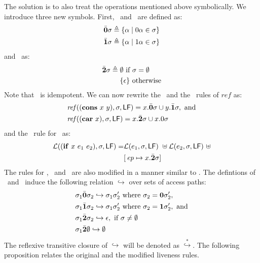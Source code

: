 \documentclass[9pt]{sigplanconf}
\begin{document}
The  solution  is  to   also  treat  the  operations  mentioned  above
symbolically.  We  introduce three  new  symbols.   First, \bcar\  and
\bcdr\ are defined as:
\begin{align*}
 \bar{\mathbf{0}}\sigma &\triangleq \{\alpha \mid 0\alpha \in \sigma\}\\
 \bar{\mathbf{1}}\sigma &\triangleq \{\alpha \mid 1\alpha \in \sigma\}
\end{align*}
and \cbar\ as:
\begin{align*}
 \bar{\mathbf{2}}\sigma \triangleq\; & \emptyset~\mbox{if}~\sigma = \emptyset\\
                       & \{\epsilon\} ~\mbox{otherwise}
\end{align*}
Note that \cbar\ is idempotent. 
We can now rewrite the \CONS\ and the \CAR\ rules of $\mathit{ref}$ as:
\begin{align*}
&\mathit{ref\/}((\mbox{$\mathbf{cons}$}~x~y),\sigma,\mathsf{LF})
= x.\bar{\mathbf{0}}\sigma \cup y.\bar{\mathbf{1}}\sigma  \label{eqn:mod-cons},~
\mbox{and} \\
&\mathit{ref\/}((\mbox{$\mathbf{car}$}~x),\sigma,\mathsf{LF})
          =   x.\bar{\mathbf{2}}\sigma \cup x.0\sigma
\end{align*}
and the \Lfunonly\ rule
for \SIF\ as:
\begin{align*}
\mathcal{L}((\mbox{$\mathbf{ if}$}~x~e_1~e_2),\sigma,\mathsf{LF}) =
                    &\mathcal{L}(e_1,\sigma,\mathsf{LF})~\uplus
        \mathcal{L}(e_2,\sigma,\mathsf{LF})~\uplus\\
        &[\,\mathit{ep} \mapsto  x.\bar{\mathbf{2}} \sigma]
\end{align*}
The rules for \CDR, \PRIM\ and  \NULLQ\  are also modified in a manner
similar to \CAR.
The  defintions of \bcar\, \bcdr\ and \cbar\  induce   the  following
relation $\hookrightarrow$ over sets of access paths:
\begin{align*}
  &\sigma_1\bar{\mathbf{0}}\sigma_2  \hookrightarrow
  \sigma_1\sigma_2'\mbox{ where } \sigma_2 = \mathbf{0}\sigma_2',\\
&\sigma_1\bar{\mathbf{1}}\sigma_2  \hookrightarrow
  \sigma_1\sigma_2'\mbox{ where } \sigma_2 =
  \mathbf{1}\sigma_2',~\mbox{and}\\
&\sigma_1\bar{\mathbf{2}} \sigma_2 \hookrightarrow \epsilon, \mbox{ if } \sigma \ne
  \emptyset \\
&\sigma_1\bar{\mathbf{2}} \emptyset \hookrightarrow \emptyset
\end{align*}
The reflexive  transitive closure of  $\hookrightarrow$ will
be   denoted    as   $\stackrel{*}{\hookrightarrow}$.    The
following proposition relates  the original and the modified
liveness rules.
\end{document}
